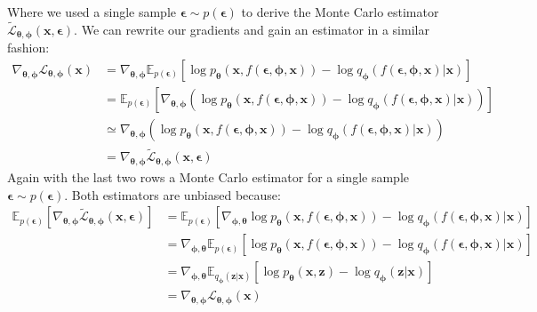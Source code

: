 \documentclass[12pt]{report}
\theoremstyle{definition}
\begin{document}
Where we used a single sample $\pmb{\epsilon}\sim p(\pmb{\epsilon})$ to derive the Monte Carlo estimator $\tilde{\mathcal{L}}_{\pmb{\theta}, \pmb{\phi}}(\mathbf{x}, \pmb{\epsilon})$. We can rewrite our gradients and  gain an estimator in a similar fashion:
\begin{equation}
\begin{split}
\nabla_{\pmb{\theta}, \pmb{\phi}}\mathcal{L}_{\pmb{\theta}, \pmb{\phi}}(\mathbf{x}) 
& = \nabla_{\pmb{\theta}, \pmb{\phi}} \mathbb{E}_{p(\pmb{\epsilon})}\left[ \log p_{\mathbf{\theta}}(\mathbf{x}, f(\pmb{\epsilon}, \pmb{\phi}, \mathbf{x})) - \log q_{\mathbf{\phi}}(f(\pmb{\epsilon}, \pmb{\phi}, \mathbf{x})|\mathbf{x}) \right]	\\
& = \mathbb{E}_{p(\pmb{\epsilon})}\left[ \nabla_{\pmb{\theta}, \pmb{\phi}}(\log p_{\mathbf{\theta}}(\mathbf{x}, f(\pmb{\epsilon}, \pmb{\phi}, \mathbf{x})) - \log q_{\mathbf{\phi}}(f(\pmb{\epsilon}, \pmb{\phi}, \mathbf{x})|\mathbf{x})) \right]	\\
& \simeq \nabla_{\pmb{\theta}, \pmb{\phi}}(\log p_{\mathbf{\theta}}(\mathbf{x}, f(\pmb{\epsilon}, \pmb{\phi}, \mathbf{x})) - \log q_{\mathbf{\phi}}(f(\pmb{\epsilon}, \pmb{\phi}, \mathbf{x})|\mathbf{x})) \\
& = \nabla_{\pmb{\theta}, \pmb{\phi}}\tilde{\mathcal{L}}_{\pmb{\theta}, \pmb{\phi}}(\mathbf{x}, \pmb{\epsilon})
\end{split}
\end{equation}
Again with the last two rows a Monte Carlo estimator for a single sample $\pmb{\epsilon} \sim p(\pmb{\epsilon})$. 
Both estimators are unbiased because:
\begin{equation}
\begin{split}
\mathbb{E}_{p(\pmb{\epsilon})}\left[ \nabla_{\pmb{\theta}, \pmb{\phi}}\tilde{\mathcal{L}}_{\pmb{\theta}, \pmb{\phi}}(\mathbf{x}, \pmb{\epsilon}) \right] 
& = \mathbb{E}_{p(\pmb{\epsilon})}\left[ \nabla_{\pmb{\phi}, \pmb{\theta}} \log p_{\mathbf{\theta}}(\mathbf{x}, f(\pmb{\epsilon}, \pmb{\phi}, \mathbf{x})) - \log q_{\mathbf{\phi}}(f(\pmb{\epsilon}, \pmb{\phi}, \mathbf{x})|\mathbf{x}) \right] \\
& = \nabla_{\pmb{\phi}, \pmb{\theta}} \mathbb{E}_{p(\pmb{\epsilon})}\left[  \log p_{\mathbf{\theta}}(\mathbf{x}, f(\pmb{\epsilon}, \pmb{\phi}, \mathbf{x})) - \log q_{\mathbf{\phi}}(f(\pmb{\epsilon}, \pmb{\phi}, \mathbf{x})|\mathbf{x}) \right] \\
& = \nabla_{\pmb{\phi}, \pmb{\theta}} \mathbb{E}_{q_{\mathbf{\phi}}(\mathbf{z}|\mathbf{x})}\left[  \log p_{\mathbf{\theta}}(\mathbf{x}, \mathbf{z}) - \log q_{\mathbf{\phi}}(\mathbf{z}|\mathbf{x}) \right] \\
& = \nabla_{\pmb{\theta}, \pmb{\phi}}\mathcal{L}_{\pmb{\theta}, \pmb{\phi}}(\mathbf{x}) 
\end{split}
\end{equation}
\end{document}
